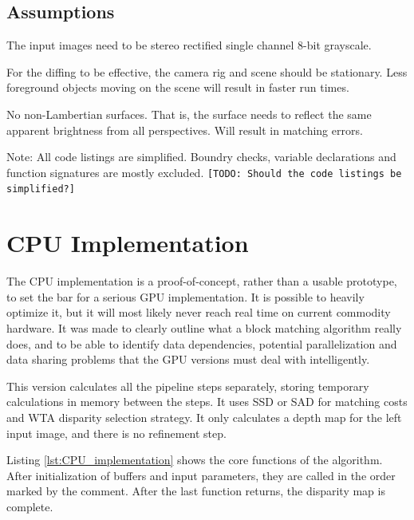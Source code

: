 \subsection{Assumptions}

The input images need to be stereo rectified single channel 8-bit
grayscale.

For the diffing to be effective, the camera rig and scene should be
stationary. Less foreground objects moving on the scene will result in
faster run times.

No non-Lambertian surfaces. That is, the surface needs to reflect the
same apparent brightness from all perspectives. Will result in
matching errors.

Note: All code listings are simplified. Boundry checks, variable
declarations and function signatures are mostly excluded.
\texttt{[TODO: Should the code listings be simplified?]}

\section{CPU Implementation}

The CPU implementation is a proof-of-concept, rather than a usable
prototype, to set the bar for a serious GPU implementation. It is
possible to heavily optimize it, but it will most likely never reach
real time on current commodity hardware. It was made to clearly
outline what a block matching algorithm really does, and to be able to
identify data dependencies, potential parallelization and data sharing
problems that the GPU versions must deal with intelligently.

This version calculates all the pipeline steps separately, storing
temporary calculations in memory between the steps. It uses SSD or SAD
for matching costs and WTA disparity selection strategy. It only
calculates a depth map for the left input image, and there is no
refinement step.

Listing \ref{lst:CPU_implementation} shows the core functions of the
algorithm. After initialization of buffers and input parameters, they
are called in the order marked by the comment. After the last function
returns, the disparity map is complete.


